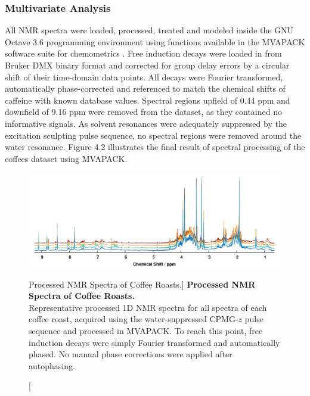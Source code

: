 \subsubsection{Multivariate Analysis}

\begin{doublespace}
All NMR spectra were loaded, processed, treated and modeled inside the GNU
Octave 3.6 programming environment \cite{eaton2008} using functions available
in the MVAPACK software suite for chemometrics \cite{worley:acscb2014}.
Free induction decays were loaded in from Bruker DMX binary format and
corrected for group delay errors by a circular shift of their time-domain
data points. All decays were Fourier transformed, automatically phase-corrected
and referenced to match the chemical shifts of caffeine with known database
values. Spectral regions upfield of 0.44 ppm and downfield of 9.16 ppm were
removed from the dataset, as they contained no informative signals. As solvent
resonances were adequately suppressed by the excitation sculpting pulse
sequence, no spectral regions were removed around the water resonance.
Figure 4.2 illustrates the final result of spectral processing of the coffees
dataset using MVAPACK.
\end{doublespace}

\begin{figure}[ht!]
\includegraphics[width=6.5in]{figs/apps/02-spectra.png}
\caption
      [Processed \hnmr{} NMR Spectra of Coffee Roasts.]{
  {\bf Processed \hnmr{} NMR Spectra of Coffee Roasts.}
  \\
  Representative processed 1D \hnmr{} NMR spectra for all spectra of each
  coffee roast, acquired using the water-suppressed CPMG-$z$ pulse sequence
  and processed in MVAPACK. To reach this point, free induction decays were
  simply Fourier transformed and automatically phased. No manual phase
  corrections were applied after autophasing.
}
\end{figure}

